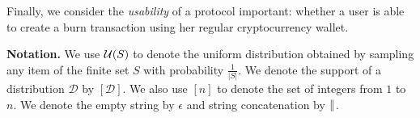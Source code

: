 Finally, we consider the \emph{usability} of a protocol important: whether a user is able to create a burn transaction using her regular cryptocurrency wallet.

\noindent
\textbf{Notation.} We use $\mathcal{U}(S)$ to denote the uniform distribution
obtained by sampling any item of the finite set $S$ with probability $\frac{1}{|S|}$.
We denote the support of a distribution $\mathcal{D}$ by $[\mathcal{D}]$. We also use $[n]$ to denote the set of integers from $1$ to $n$.
We denote the empty string by $\epsilon$ and string concatenation by $\mathbin{\|}$.

